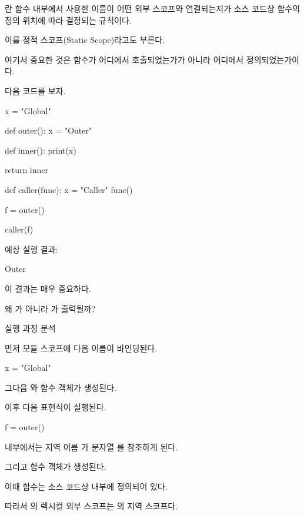 란 함수 내부에서 사용한 이름이 어떤 외부 스코프와 연결되는지가 소스 코드상 함수의 정의 위치에 따라 결정되는 규칙이다.

이를 정적 스코프(Static Scope)라고도 부른다.

여기서 중요한 것은 함수가 어디에서 호출되었는가가 아니라 어디에서 정의되었는가이다.

다음 코드를 보자.

\begin{dhkcode}
x = "Global"

def outer():
    x = "Outer"

    def inner():
        print(x)

    return inner

def caller(func):
    x = "Caller"
    func()

f = outer()

caller(f)
\end{dhkcode}

예상 실행 결과:

\begin{dhkzsh}
Outer
\end{dhkzsh}

이 결과는 매우 중요하다.

왜 가 아니라 가 출력될까?

\begin{dhknote}
\begin{dhksmry}[centered]
실행 과정 분석
\end{dhksmry}
\end{dhknote}

먼저 모듈 스코프에 다음 이름이 바인딩된다.

\begin{dhkcode}
x = "Global"
\end{dhkcode}

그다음 와  함수 객체가 생성된다.

이후 다음 표현식이 실행된다.

\begin{dhkcode}
f = outer()
\end{dhkcode}

 내부에서는 지역 이름 가 문자열 를 참조하게 된다.

그리고  함수 객체가 생성된다.

이때  함수는 소스 코드상  내부에 정의되어 있다.

따라서 의 렉시컬 외부 스코프는 의 지역 스코프다.

